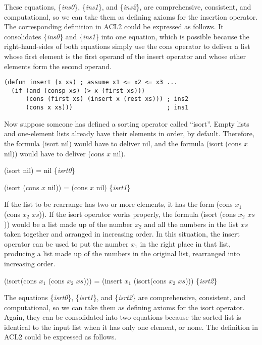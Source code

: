 These equations, \{\emph{ins0}\}, \{\emph{ins1}\}, and \{\emph{ins2}\},
are comprehensive, consistent, and computational,
so we can take them as defining axioms for the insertion operator.
The corresponding definition in ACL2 could be expressed as follows.
It consolidates \{\emph{ins0}\} and \{\emph{ins1}\} into one equation,
which is possible because the right-hand-sides of both equations
simply use the cons operator to deliver a list whose first element
is the first operand of the insert operator and whose other elements
form the second operand.

\label{defun:insert-isort}
\begin{Verbatim}
(defun insert (x xs) ; assume x1 <= x2 <= x3 ...
  (if (and (consp xs) (> x (first xs)))
      (cons (first xs) (insert x (rest xs))) ; ins2
      (cons x xs)))                          ; ins1
\end{Verbatim}

Now suppose someone has defined a sorting operator called ``isort''.
Empty lists and one-element lists already have their
elements in order, by default.
Therefore, the formula (isort nil) would have to deliver nil,
and the formula (isort (cons $x$ nil)) would have to deliver
(cons $x$ nil).

\label{eq:isrt0}
\hspace{1cm} (isort nil) = nil \hfill \{\emph{isrt0}\}

\label{eq:isrt1}
\hspace{1cm} (isort (cons $x$ nil)) = (cons $x$ nil) \hfill \{\emph{isrt1}\}

If the list to be rearrange has two or more elements,
it has the form (cons $x_1$ (cons $x_2$ $xs$)).
If the isort operator works properly,
the formula (isort (cons $x_2$ $xs$)) would be
a list made up of the number $x_2$ and all the numbers in the list $xs$
taken together and
arranged in increasing order.
In this situation, the insert operator can be used to put the number $x_1$ in
the right place in that list, producing a list made up of the
numbers in the original list, rearranged into increasing order.

\label{eq:isrt2}
\hspace{1cm} (isort(cons $x_1$ (cons $x_2$ $xs$))) =
(insert $x_1$ (isort(cons $x_2$ $xs$)))  \hfill \{\emph{isrt2}\}

The equations \{\emph{isrt0}\}, \{\emph{isrt1}\}, and \{\emph{isrt2}\}
are comprehensive, consistent, and computational,
so we can take them as defining axioms for the isort operator.
Again, they can be consolidated into two equations because
the sorted list is identical to the input list when it has
only one element, or none.
The definition in ACL2 could be expressed as follows.

